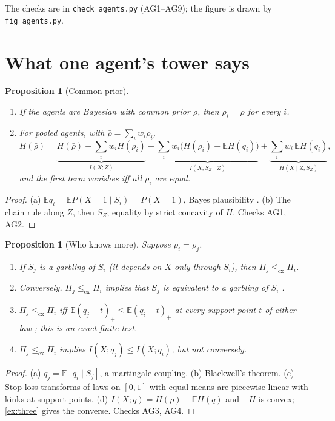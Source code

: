 \documentclass[11pt]{article}
\newtheorem{proposition}[theorem]{Proposition}
\theoremstyle{definition}
\theoremstyle{remark}
\newcommand{\EE}{\mathbb E}
\newcommand{\cx}{\le_{\mathrm{cx}}}
\begin{document}
The checks are in \texttt{check\_agents.py} (AG1--AG9); the figure is drawn by \texttt{fig\_agents.py}.

\section{What one agent's tower says}
\begin{proposition}[Common prior]\label{prop:prior}
\begin{enumerate}[label=(\alph*)]
\item If the agents are Bayesian with common prior $\rho$, then $\rho_i=\rho$ for every $i$.
\item For pooled agents, with $\bar\rho=\sum_iw_i\rho_i$,
\[
H(\bar\rho)=\underbrace{H(\bar\rho)-\textstyle\sum_iw_iH(\rho_i)}_{I(X;Z)}+\underbrace{\textstyle\sum_iw_i\bigl(H(\rho_i)-\EE H(q_i)\bigr)}_{I(X;S_Z\mid Z)}
+\underbrace{\textstyle\sum_iw_i\,\EE H(q_i)}_{H(X\mid Z,S_Z)},
\]
and the first term vanishes iff all $\rho_i$ are equal.
\end{enumerate}
\end{proposition}
\begin{proof}
(a) $\EE q_i=\EE P(X=1\mid S_i)=P(X=1)$, Bayes plausibility \cite{KamenicaGentzkow2011}. (b) The chain rule along $Z$, then $S_Z$; equality
by strict concavity of $H$. Checks AG1, AG2.
\end{proof}

\begin{proposition}[Who knows more]\label{prop:blackwell}
Suppose $\rho_i=\rho_j$.
\begin{enumerate}[label=(\alph*)]
\item If $S_j$ is a garbling of $S_i$ (it depends on $X$ only through $S_i$), then $\Pi_j\cx\Pi_i$.
\item Conversely, $\Pi_j\cx\Pi_i$ implies that $S_j$ is equivalent to a garbling of $S_i$ \cite{Blackwell1953}.
\item $\Pi_j\cx\Pi_i$ iff $\EE(q_j-t)_+\le\EE(q_i-t)_+$ at every support point $t$ of either law \cite[Thm.~3.A.1]{ShakedShanthikumar2007};
  this is an exact finite test.
\item $\Pi_j\cx\Pi_i$ implies $I(X;q_j)\le I(X;q_i)$, but not conversely.
\end{enumerate}
\end{proposition}
\begin{proof}
(a) $q_j=\EE[q_i\mid S_j]$, a martingale coupling. (b) Blackwell's theorem. (c) Stop-loss transforms of laws on $[0,1]$ with equal means
are piecewise linear with kinks at support points. (d) $I(X;q)=H(\rho)-\EE H(q)$ and $-H$ is convex; \cref{ex:three} gives the converse.
Checks AG3, AG4.
\end{proof}
\end{document}
